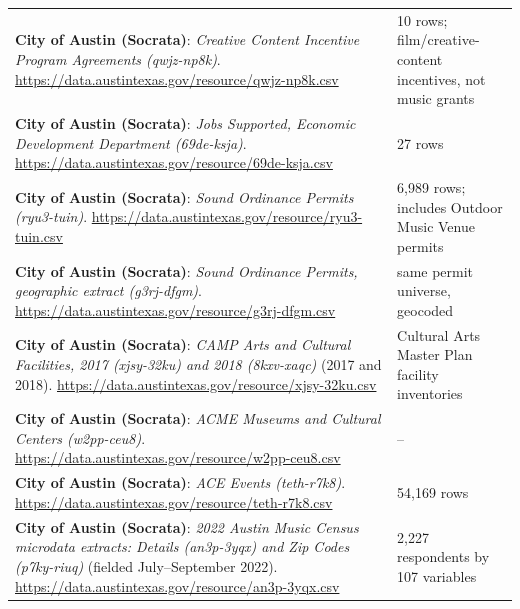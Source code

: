 {\begin{longtable}{@{}P{0.60\textwidth} P{0.33\textwidth}@{}}
\textbf{City of Austin (Socrata)}: \textit{Creative Content Incentive Program Agreements (qwjz-np8k)}. \url{https://data.austintexas.gov/resource/qwjz-np8k.csv} & 10 rows; film/creative-content incentives, not music grants \\
\textbf{City of Austin (Socrata)}: \textit{Jobs Supported, Economic Development Department (69de-ksja)}. \url{https://data.austintexas.gov/resource/69de-ksja.csv} & 27 rows \\
\textbf{City of Austin (Socrata)}: \textit{Sound Ordinance Permits (ryu3-tuin)}. \url{https://data.austintexas.gov/resource/ryu3-tuin.csv} & 6,989 rows; includes Outdoor Music Venue permits \\
\textbf{City of Austin (Socrata)}: \textit{Sound Ordinance Permits, geographic extract (g3rj-dfgm)}. \url{https://data.austintexas.gov/resource/g3rj-dfgm.csv} & same permit universe, geocoded \\
\textbf{City of Austin (Socrata)}: \textit{CAMP Arts and Cultural Facilities, 2017 (xjsy-32ku) and 2018 (8kxv-xaqc)} (2017 and 2018). \url{https://data.austintexas.gov/resource/xjsy-32ku.csv} & Cultural Arts Master Plan facility inventories \\
\textbf{City of Austin (Socrata)}: \textit{ACME Museums and Cultural Centers (w2pp-ceu8)}. \url{https://data.austintexas.gov/resource/w2pp-ceu8.csv} & -- \\
\textbf{City of Austin (Socrata)}: \textit{ACE Events (teth-r7k8)}. \url{https://data.austintexas.gov/resource/teth-r7k8.csv} & 54,169 rows \\
\textbf{City of Austin (Socrata)}: \textit{2022 Austin Music Census microdata extracts: Details (an3p-3yqx) and Zip Codes (p7ky-riuq)} (fielded July--September 2022). \url{https://data.austintexas.gov/resource/an3p-3yqx.csv} & 2,227 respondents by 107 variables \\
\end{longtable}
}
